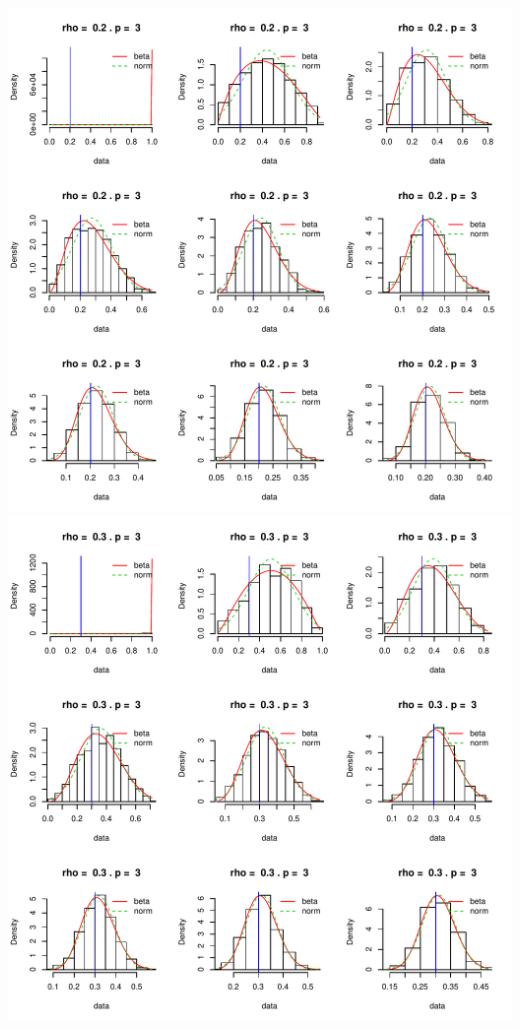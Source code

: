 \documentclass[]{article}
\begin{document}
\includegraphics{2016_w09_files/figure-latex/unnamed-chunk-15-3.pdf}
\includegraphics{2016_w09_files/figure-latex/unnamed-chunk-15-4.pdf}
\end{document}
